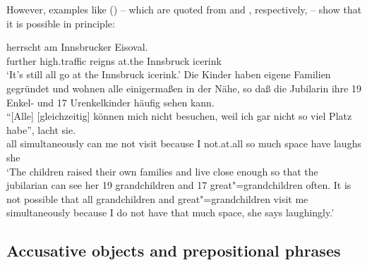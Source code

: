 \noindent
However, examples like () -- which are quoted from
 and , respectively, -- show that it is possible in principle:

\eal
\ex
\gll [Weiterhin] [Hochbetrieb] herrscht am Innsbrucker Eisoval.\footnotemark\\
     \spacebr{}further \spacebr{}high.traffic reigns at.the Innsbruck icerink\\
\glt ‘It’s still all go at the Innsbruck icerink.’
\ex Die Kinder haben eigene Familien gegründet und wohnen alle einigermaßen in der Nähe, so daß die Jubilarin ihre 19 Enkel- und 17 Urenkelkinder häufig sehen kann.\\
\gll "`[Alle] [gleichzeitig] können mich nicht besuchen, weil ich {gar nicht} so viel Platz habe"', lacht sie.\footnotemark\\
     \hspaceThis{"`[}all simultaneously can me not visit  because I not.at.all so much space have    laughs she\\      
\glt `The children raised their own families and live close enough so that the jubilarian can see her 19 grandchildren and 17 great"=grandchildren often. It is not possible that all grandchildren and great"=grandchildren visit me simultaneously
because I do not have that much space, she says laughingly.'
\zl






\subsection{Accusative objects and prepositional phrases}

